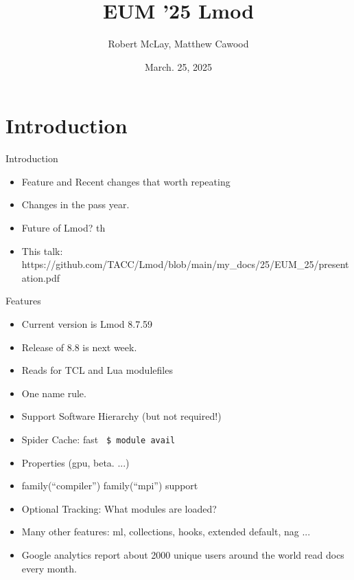 \documentclass{beamer}
\begin{document}
\title[Lmod]{EUM '25 Lmod}
\author{Robert McLay, Matthew Cawood} 
\date{March. 25, 2025}

\frame{\titlepage} 

\section{Introduction}

\begin{frame}{Introduction}
  \begin{itemize}
    \item Feature and Recent changes that worth repeating
    \item Changes in the pass year.
    \item Future of Lmod? th
    \item This talk: https://github.com/TACC/Lmod/blob/main/my\_docs/25/EUM\_25/presentation.pdf
  \end{itemize}
\end{frame}

\begin{frame}{Features}
  \begin{itemize}
    \item Current version is Lmod 8.7.59
    \item Release of 8.8 is next week.
    \item Reads for TCL and Lua modulefiles
    \item One name rule.
    \item Support Software Hierarchy (but not required!)
    \item Spider Cache: fast \texttt{\color{blue} \$ module avail}
    \item Properties (gpu, beta. ...)
    \item family(``compiler'') family(``mpi'') support
    \item Optional Tracking: What modules are loaded?
    \item Many other features: ml, collections, hooks,
      extended default, nag ...
    \item Google analytics report about 2000 unique users around the
      world read docs every month.
  \end{itemize}
\end{frame}
\end{document}

